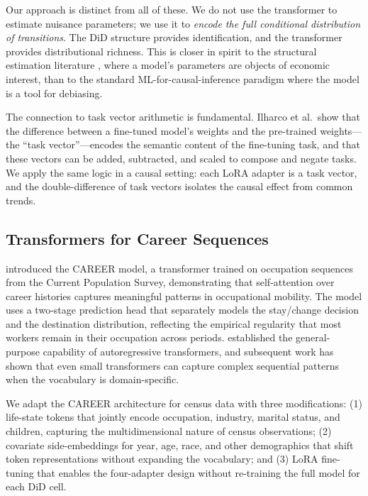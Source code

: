 \documentclass[12pt]{article}
\begin{document}
Our approach is distinct from all of these. We do not use the transformer to estimate nuisance parameters; we use it to \textit{encode the full conditional distribution of transitions}. The DiD structure provides identification, and the transformer provides distributional richness. This is closer in spirit to the structural estimation literature \citep{moon2015linear}, where a model's parameters are objects of economic interest, than to the standard ML-for-causal-inference paradigm where the model is a tool for debiasing.

The connection to task vector arithmetic \citep{ilharco2023editing} is fundamental. Ilharco et al.\ show that the difference between a fine-tuned model's weights and the pre-trained weights---the ``task vector''---encodes the semantic content of the fine-tuning task, and that these vectors can be added, subtracted, and scaled to compose and negate tasks. We apply the same logic in a causal setting: each LoRA adapter is a task vector, and the double-difference of task vectors isolates the causal effect from common trends.

\subsection{Transformers for Career Sequences}

\citet{vafa2022career} introduced the CAREER model, a transformer trained on occupation sequences from the Current Population Survey, demonstrating that self-attention over career histories captures meaningful patterns in occupational mobility. The model uses a two-stage prediction head that separately models the stay/change decision and the destination distribution, reflecting the empirical regularity that most workers remain in their occupation across periods. \citet{radford2019language} established the general-purpose capability of autoregressive transformers, and subsequent work has shown that even small transformers can capture complex sequential patterns when the vocabulary is domain-specific.

We adapt the CAREER architecture for census data with three modifications: (1) life-state tokens that jointly encode occupation, industry, marital status, and children, capturing the multidimensional nature of census observations; (2) covariate side-embeddings for year, age, race, and other demographics that shift token representations without expanding the vocabulary; and (3) LoRA fine-tuning that enables the four-adapter design without re-training the full model for each DiD cell.
\end{document}
